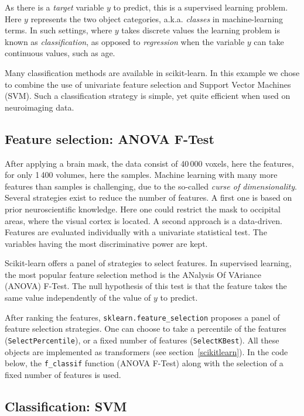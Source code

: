 \documentclass{frontiersSCNS} %
\begin{document}
As there is a \emph{target} variable $y$ to predict, this is a supervised
learning problem. Here $y$ represents the two object categories, a.k.a.
\emph{classes} in machine-learning terms. In such settings, where $y$
takes discrete values the learning
problem is known as \emph{classification}, as opposed to
\emph{regression} when the variable $y$ can take continuous values,
such as age.

Many classification methods are available in scikit-learn. In this
example we chose to
combine the use of univariate feature selection and Support Vector
Machines (SVM). Such a classification strategy is simple,
yet quite efficient when used on neuroimaging data.

\subsection{Feature selection: ANOVA F-Test}

After applying a brain mask, the data consist of 40\,000 voxels, here
the features, for only 1\,400 volumes, here the samples.
Machine learning with many more features than samples
is challenging, due to the so-called \emph{curse of dimensionality}.
Several strategies exist to reduce the number of features.
A first one is based on prior neuroscientific
knowledge. Here one could restrict the mask to occipital areas, where the visual
cortex is located. A second approach is a data-driven. Features
are evaluated individually with a univariate statistical test. The variables
having the most discriminative power are kept.

Scikit-learn offers a panel of strategies to select features. In supervised
learning, the most popular feature selection method is the
ANalysis Of VAriance (ANOVA) F-Test. 
The null hypothesis of this test is that the feature takes the same value
independently of the value of $y$ to predict.

After ranking the features, \verb!sklearn.feature_selection! proposes a panel
of feature selection strategies. One can choose to take a percentile of the features
(\verb!SelectPercentile!), or a fixed number of features (\verb!SelectKBest!).
All these objects are implemented as transformers (see
 section~\ref{scikitlearn}).
In the code below, the \verb!f_classif! function (ANOVA F-Test) along with
the selection of a fixed number of features is used.

\subsection{Classification: SVM}
\end{document}
